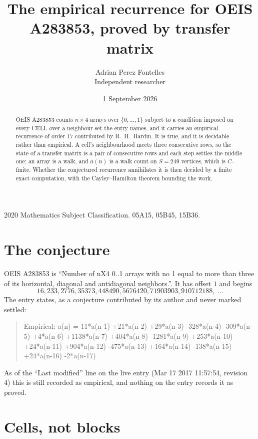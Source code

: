 \documentclass[11pt,a4paper]{article}
\title{The empirical recurrence for OEIS A283853, proved by transfer matrix}
\author{Adrian Perez Fontelles\\ \small Independent researcher}
\date{1 September 2026}
\theoremstyle{plain}
\theoremstyle{definition}
\begin{document}
\maketitle

\begin{abstract}
OEIS A283853 counts $n\times4$ arrays over $\{0,\dots,1\}$ subject to a condition imposed on
every CELL over a neighbour set the entry names, and it carries an empirical recurrence of
order $17$ contributed by R.~H.~Hardin. It is true, and it is decidable rather than
empirical. A cell's neighbourhood meets three consecutive rows, so the state of a transfer
matrix is a pair of consecutive rows and each step settles the middle one; an array is a
walk, and $a(n)$ is a walk count on $S=249$ vertices, which is $C$-finite. Whether the
conjectured recurrence annihilates it is then decided by a finite exact computation, with the
Cayley--Hamilton theorem bounding the work.
\end{abstract}

\noindent\small 2020 Mathematics Subject Classification. 05A15, 05B45, 15B36.\normalsize

\section{The conjecture}

OEIS A283853 is ``Number of nX4 0..1 arrays with no 1 equal to more than three of its horizontal, diagonal and antidiagonal neighbors.''. It has offset $1$ and begins
\[
16, 233, 2776, 35373, 448490, 5676420, 71903903, 910712188,\ \dots
\]
The entry states, as a conjecture contributed by its author and never marked settled:
\begin{quote}
Empirical: a(n) = 11*a(n-1) +21*a(n-2) +29*a(n-3) -328*a(n-4) -309*a(n-5) +4*a(n-6) +1138*a(n-7) +404*a(n-8) -1281*a(n-9) +253*a(n-10) +24*a(n-11) +904*a(n-12) -475*a(n-13) +164*a(n-14) -138*a(n-15) +24*a(n-16) -2*a(n-17)
\end{quote}
As of the ``Last modified'' line on the live entry (Mar 17 2017 11:57:54, revision 4) this is still
recorded as empirical, and nothing on the entry records it as proved.

\section{Cells, not blocks}
\end{document}
